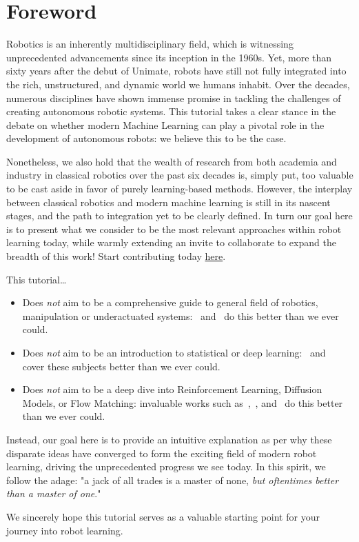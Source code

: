 \section*{Foreword}

Robotics is an inherently multidisciplinary field, which is witnessing unprecedented advancements since its inception in the 1960s.
Yet, more than sixty years after the debut of Unimate, robots have still not fully integrated into the rich, unstructured, and dynamic world we humans inhabit.
Over the decades, numerous disciplines have shown immense promise in tackling the challenges of creating autonomous robotic systems.
This tutorial takes a clear stance in the debate on whether modern Machine 
Learning can play a pivotal role in the development of 
autonomous robots: we believe this to be the case.

Nonetheless, we also hold that the wealth of research from both academia and industry in classical robotics over the past six decades is, simply put, too valuable to be cast aside in favor of purely learning-based methods.
However, the interplay between classical robotics and modern machine learning is still in its nascent stages, and the path to integration yet to be clearly defined.
In turn our goal here is to present what we consider to be the most relevant approaches within robot learning today, while warmly extending an invite to collaborate to expand the breadth of this work! Start contributing today \href{https://github.com/fracapuano/robot-learning-tutorial}{here}.

This tutorial\dots
\begin{itemize}
    \item Does \emph{not} aim to be a comprehensive guide to general field of robotics, manipulation or underactuated systems:~\citet{sicilianoSpringerHandbookRobotics2016} and~\citet{tedrakeRoboticManipulationPerception,tedrakeUnderactuatedRoboticsAlgorithms} do this better than we ever could.
    \item Does \emph{not} aim to be an introduction to statistical or deep learning:~\citet{shalev-shwartzUnderstandingMachineLearning2014} and~\citet{prince2023understanding} cover these subjects better than we ever could.
    \item Does \emph{not} aim to be a deep dive into Reinforcement Learning, Diffusion Models, or Flow Matching: invaluable works such as~\citet{suttonReinforcementLearningIntroduction2018},~\citet{nakkiranStepbyStepDiffusionElementary2024}, and~\citet{lipmanFlowMatchingGuide2024} do this better than we ever could.
\end{itemize}

Instead, our goal here is to provide an intuitive explanation as per why these disparate ideas have converged to form the exciting field of modern robot learning, driving the unprecedented progress we see today. 
In this spirit, we follow the adage: "a jack of all trades is a master of none, \emph{but oftentimes better than a master of one}."

We sincerely hope this tutorial serves as a valuable starting point for your journey into robot learning.